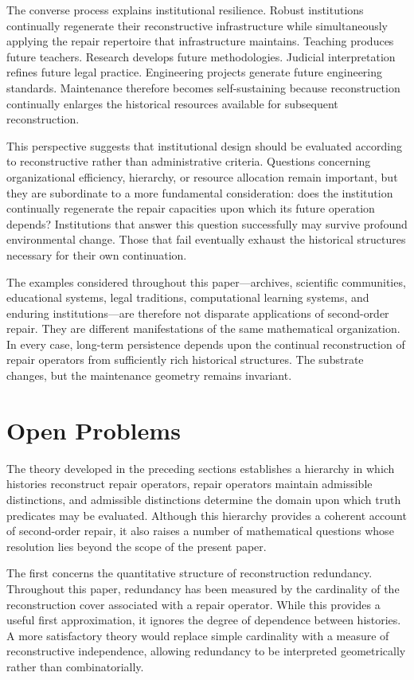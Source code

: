 \documentclass[12pt,oneside]{article}
\theoremstyle{plain}
\theoremstyle{definition}
\theoremstyle{remark}
\theoremstyle{plain}
\begin{document}
The converse process explains institutional resilience. Robust institutions continually regenerate
their reconstructive infrastructure while simultaneously applying the repair repertoire that
infrastructure maintains. Teaching produces future teachers. Research develops future methodologies.
Judicial interpretation refines future legal practice. Engineering projects generate future
engineering standards. Maintenance therefore becomes self-sustaining because reconstruction
continually enlarges the historical resources available for subsequent reconstruction.

This perspective suggests that institutional design should be evaluated according to reconstructive
rather than administrative criteria. Questions concerning organizational efficiency, hierarchy, or
resource allocation remain important, but they are subordinate to a more fundamental consideration:
does the institution continually regenerate the repair capacities upon which its future operation
depends? Institutions that answer this question successfully may survive profound environmental
change. Those that fail eventually exhaust the historical structures necessary for their own
continuation.

The examples considered throughout this paper---archives, scientific communities, educational
systems, legal traditions, computational learning systems, and enduring institutions---are therefore
not disparate applications of second-order repair. They are different manifestations of the same
mathematical organization. In every case, long-term persistence depends upon the continual
reconstruction of repair operators from sufficiently rich historical structures. The substrate
changes, but the maintenance geometry remains invariant.

\section{Open Problems}

The theory developed in the preceding sections establishes a hierarchy in which histories
reconstruct repair operators, repair operators maintain admissible distinctions, and admissible
distinctions determine the domain upon which truth predicates may be evaluated. Although this
hierarchy provides a coherent account of second-order repair, it also raises a number of
mathematical questions whose resolution lies beyond the scope of the present paper.

The first concerns the quantitative structure of reconstruction redundancy. Throughout this paper,
redundancy has been measured by the cardinality of the reconstruction cover associated with a
repair operator. While this provides a useful first approximation, it ignores the degree of
dependence between histories. A more satisfactory theory would replace simple cardinality with a
measure of reconstructive independence, allowing redundancy to be interpreted geometrically rather
than combinatorially.
\end{document}
